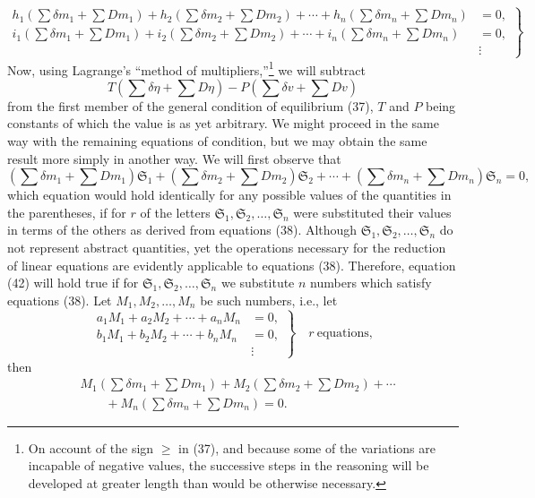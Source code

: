\documentclass[11pt]{article}
\newcommand{\unit}[1]{\mathfrak{S}_{#1}}
\begin{document}
\begin{equation}
\left.
\begin{aligned}
h_1(\sum\delta m_1+\sum Dm_1)
+h_2(\sum\delta m_2+\sum Dm_2)
+\cdots
+h_n(\sum\delta m_n+\sum Dm_n)&=0,\\
i_1(\sum\delta m_1+\sum Dm_1)
+i_2(\sum\delta m_2+\sum Dm_2)
+\cdots
+i_n(\sum\delta m_n+\sum Dm_n)&=0,\\
&\vdots
\end{aligned}
\right\}
\end{equation}
Now, using Lagrange's ``method of multipliers,''\footnote{On account of the sign \(\geq\) in (37), and because some of the variations are incapable of negative values, the successive steps in the reasoning will be developed at greater length than would be otherwise necessary.} we will subtract
\[
T(\sum\delta\eta+\sum D\eta)-P(\sum\delta v+\sum Dv)
\]
from the first member of the general condition of equilibrium (37), \(T\) and \(P\) being constants of which the value is as yet arbitrary. We might proceed in the same way with the remaining equations of condition, but we may obtain the same result more simply in another way. We will first observe that
\begin{equation}
(\sum\delta m_1+\sum Dm_1)\unit{1}
+(\sum\delta m_2+\sum Dm_2)\unit{2}+\cdots
+(\sum\delta m_n+\sum Dm_n)\unit{n}=0,
\end{equation}
which equation would hold identically for any possible values of the quantities in the parentheses, if for \(r\) of the letters \(\unit{1},\unit{2},\ldots,\unit{n}\) were substituted their values in terms of the others as derived from equations (38). Although \(\unit{1},\unit{2},\ldots,\unit{n}\) do not represent abstract quantities, yet the operations necessary for the reduction of linear equations are evidently applicable to equations (38). Therefore, equation (42) will hold true if for \(\unit{1},\unit{2},\ldots,\unit{n}\) we substitute \(n\) numbers which satisfy equations (38). Let \(M_1,M_2,\ldots,M_n\) be such numbers, i.e., let
\begin{equation}
\left.
\begin{aligned}
a_1M_1+a_2M_2+\cdots+a_nM_n&=0,\\
b_1M_1+b_2M_2+\cdots+b_nM_n&=0,\\
&\vdots
\end{aligned}
\right\}
\quad r\ \text{equations},
\end{equation}
then
\begin{equation}
\begin{aligned}
&M_1(\sum\delta m_1+\sum Dm_1)
+M_2(\sum\delta m_2+\sum Dm_2)+\cdots\\
&\qquad
+M_n(\sum\delta m_n+\sum Dm_n)=0.
\end{aligned}
\end{equation}
\end{document}
